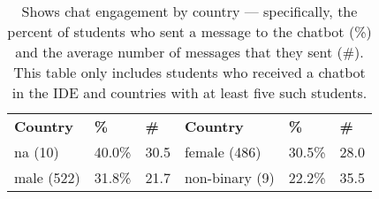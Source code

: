 \begin{table}
\centering
\begin{tabularx}{\columnwidth}{P{1.8cm} Y Y @{\hskip 3mm} P{1.8cm} Y Y}
\toprule
\textbf{Country} & \textbf{\%} & \textbf{\#} & \textbf{Country} & \textbf{\%} & \textbf{\#} \\
\cmidrule(r{3mm}){1-3} \cmidrule(l{0mm}){4-6} 
na (10) & 40.0\% & 30.5 & female (486) & 30.5\% & 28.0 \\
male (522) & 31.8\% & 21.7 & non-binary (9) & 22.2\% & 35.5 \\
\bottomrule
\end{tabularx}
\caption{Shows chat engagement by country --- specifically, the percent of students who sent a message to the chatbot (\%) and the average number of messages that they sent (\#). This table only includes students who received a chatbot in the IDE and countries with at least five such students.}
\label{tab:avg_messages_country}
\end{table}